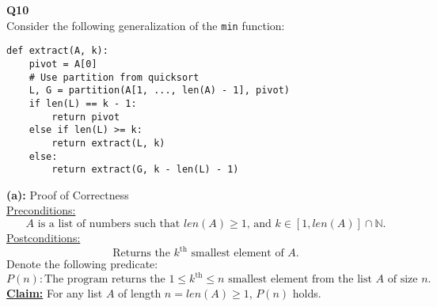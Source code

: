 \documentclass[12pt]{article}
\begin{document}
\textbf{Q10} \\
Consider the following generalization of the \texttt{min} function:
\begin{lstlisting}
def extract(A, k):
    pivot = A[0]
    # Use partition from quicksort
    L, G = partition(A[1, ..., len(A) - 1], pivot)
    if len(L) == k - 1:
        return pivot
    else if len(L) >= k:
        return extract(L, k)
    else:
        return extract(G, k - len(L) - 1)
\end{lstlisting}
\textbf{(a):} Proof of Correctness \\
\underline{Preconditions:}
\[A \text{ is a list of numbers such that } len(A) \geq 1 \text{, and } k \in [1, len(A)] \cap \mathbb{N} \text{.}\]
\underline{Postconditions:}
\[\text{Returns the } k^{\text{th}} \text{ smallest element of } A \text{.}\]
Denote the following predicate:
\[P(n): \text{The program returns the } 1 \leq k^{\text{th}} \leq n \text{ smallest element from the list } A \text{ of size } n \text{.}\]
\textbf{\underline{Claim:}} For any list $A$ of length $n = len(A) \geq 1$, $P(n)$ holds.
\end{document}
